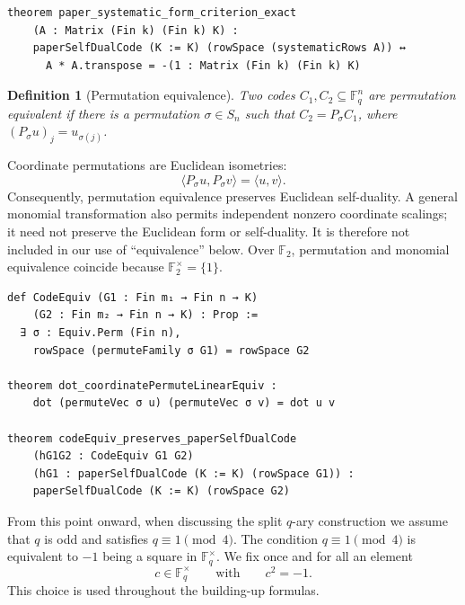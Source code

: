 \documentclass[12pt]{article}
\newtheorem{defn}{Definition}[section]
\newcommand{\F}{\mathbb{F}}
\begin{document}
\begin{lstlisting}[caption={Lean for Proposition~\ref{prop:systematic-form}.}]
theorem paper_systematic_form_criterion_exact
    (A : Matrix (Fin k) (Fin k) K) :
    paperSelfDualCode (K := K) (rowSpace (systematicRows A)) ↔
      A * A.transpose = -(1 : Matrix (Fin k) (Fin k) K)
\end{lstlisting}

\begin{defn}[Permutation equivalence]\label{def:perm-equiv}
{\rm
Two codes $C_1,C_2\subseteq\F_q^n$ are \emph{permutation equivalent}
if there is a permutation \(\sigma\in S_n\) such that
\(C_2=P_\sigma C_1\), where
\((P_\sigma u)_j=u_{\sigma(j)}\).
}
\end{defn}

Coordinate permutations are Euclidean isometries:
\[
\langle P_\sigma u,P_\sigma v\rangle=\langle u,v\rangle.
\]
Consequently, permutation equivalence preserves Euclidean self-duality.
A general monomial transformation also permits independent nonzero
coordinate scalings; it need not preserve the Euclidean form or
self-duality. It is therefore not included in our use of ``equivalence''
below. Over \(\F_2\), permutation and monomial equivalence coincide because
\(\F_2^\times=\{1\}\).

\begin{lstlisting}[caption={Lean for Definition~\ref{def:perm-equiv}.}]
def CodeEquiv (G1 : Fin m₁ → Fin n → K)
    (G2 : Fin m₂ → Fin n → K) : Prop :=
  ∃ σ : Equiv.Perm (Fin n),
    rowSpace (permuteFamily σ G1) = rowSpace G2

theorem dot_coordinatePermuteLinearEquiv :
    dot (permuteVec σ u) (permuteVec σ v) = dot u v

theorem codeEquiv_preserves_paperSelfDualCode
    (hG1G2 : CodeEquiv G1 G2)
    (hG1 : paperSelfDualCode (K := K) (rowSpace G1)) :
    paperSelfDualCode (K := K) (rowSpace G2)
\end{lstlisting}




From this point onward, when discussing the split \(q\)-ary construction we assume that \(q\) is odd and satisfies \(q \equiv 1 \pmod 4\). The condition \(q \equiv 1 \pmod 4\) is equivalent to $-1$ being a square in $\F_q^\times$. We fix once and for all an element
\[
c \in \F_q^\times \qquad \text{with} \qquad c^2 = -1.
\]
This choice is used throughout the building-up formulas.
\end{document}
